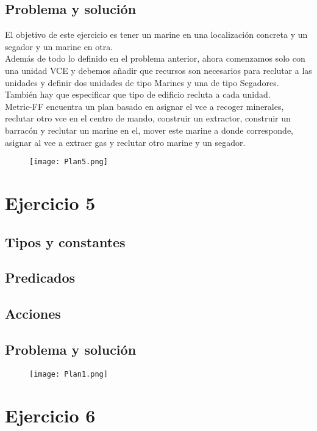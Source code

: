 \subsection{Problema y solución}
El objetivo de este ejercicio es tener un marine en una localización concreta y un segador y un marine en otra.\\
Además de todo lo definido en el problema anterior, ahora comenzamos solo con una unidad VCE y debemos añadir que recursos son necesarios para reclutar a las unidades y definir dos unidades de tipo Marines y una de tipo Segadores. También hay que especificar que tipo de edificio recluta a cada unidad.\\
Metric-FF encuentra un plan basado en asignar el vce a recoger minerales, reclutar otro vce en el centro de mando, construir un extractor, construir un barracón y reclutar un marine en el, mover este marine a donde corresponde, asignar al vce a extraer gas y reclutar otro marine y un segador.
\begin{figure}[H]
   \centering
   \texttt{[image: Plan5.png]}
\end{figure}


\section{Ejercicio 5}

\subsection{Tipos y constantes}
\subsection{Predicados}
\subsection{Acciones}
\subsection{Problema y solución}
\begin{figure}[H]
   \centering
   \texttt{[image: Plan1.png]}
\end{figure}


\section{Ejercicio 6}

